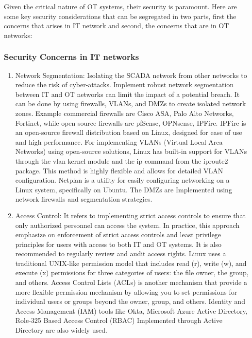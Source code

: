 Given the critical nature of OT systems, their security is paramount. Here are some key security considerations that can be segregated in two parts, first the concerns that arises in IT network and second, the concerns that are in OT networks:
\subsubsection{Security Concerns in IT networks}
\begin{enumerate}
    \item Network Segmentation: Isolating the SCADA network from other networks to reduce the risk of cyber-attacks.  Implement robust network segmentation between IT and OT networks can limit the impact of a potential breach. It can be done by using firewalls, VLANs, and DMZs to create isolated network zones. Example commercial firewalls are Cisco ASA, Palo Alto Networks, Fortinet, while open source firewalls are pfSense, OPNsense, IPFire. IPFire is an open-source firewall distribution based on Linux, designed for ease of use and high performance. For implementing VLANs (Virtual Local Area Networks) using open-source solutions, Linux has built-in support for VLANs through the vlan kernel module and the ip command from the iproute2 package. This method is highly flexible and allows for detailed VLAN configuration. Netplan is a utility for easily configuring networking on a Linux system, specifically on Ubuntu. The DMZs are Implemented using network firewalls and segmentation strategies.

    \item Access Control: It refers to implementing strict access controls to ensure that only authorized personnel can access the system. In practice, this approach emphasize on enforcement of strict access controls and least privilege principles for users with access to both IT and OT systems. It is also recommended to regularly review and audit access rights. Linux uses a traditional UNIX-like permission model that includes read (r), write (w), and execute (x) permissions for three categories of users: the file owner, the group, and others. Access Control Lists (ACLs) is another mechanism that provide a more flexible permission mechanism by allowing you to set permissions for individual users or groups beyond the owner, group, and others. Identity and Access Management (IAM) tools like Okta, Microsoft Azure Active Directory, Role-325 Based Access Control (RBAC) Implemented through Active Directory are also widely used.


\end{enumerate}
